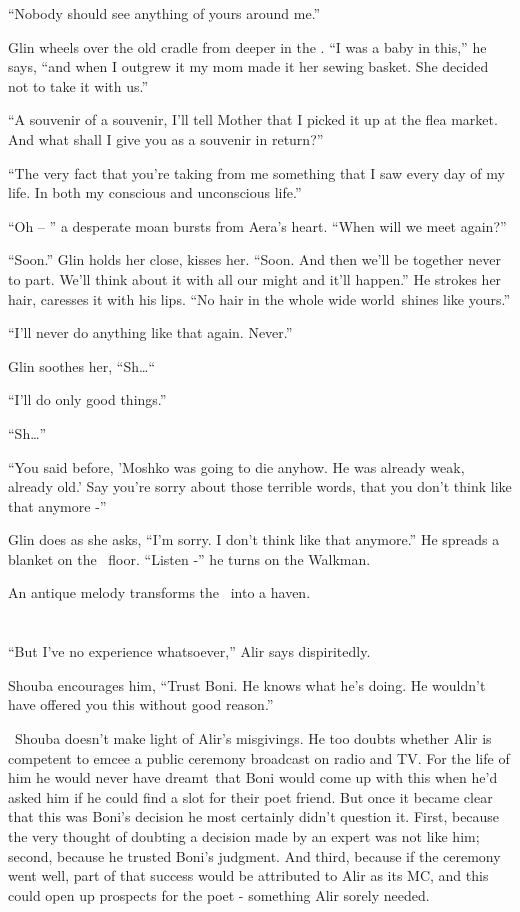 \documentclass[twoside,11pt]{book}
\begin{document}
``Nobody should see anything of yours around me.''

Glin wheels over the old cradle from deeper in the . ``I was a baby in this,'' he says,
``and when I outgrew it my mom made it her sewing basket. She decided not to take it with
us.''

``A souvenir of a souvenir, I'll tell Mother that I picked it up at the flea market. And what shall I give
you as a souvenir in return?''

``The very fact that you're taking from me something that I saw every day of my life. In both my conscious
and unconscious life.''

``Oh -- '' a desperate moan bursts from Aera's heart. ``When will we meet
again?''

``Soon.'' Glin holds her close, kisses her. ``Soon. And then we'll be together
never to part. We'll think about it with all our might and it'll happen.'' He strokes her hair, caresses
it with his lips. ``No hair in the whole wide world~shines like yours.''

``I'll never do anything like that again. Never.''

Glin soothes her, ``Sh{\dots}``~

``I'll do only good things.''

``Sh{\dots}''

``You said before, 'Moshko was going to die anyhow. He was already weak, already old.' Say you're sorry
about those terrible words, that you don't think like that anymore -''

Glin does as she asks, ``I'm sorry. I don't think like that anymore.'' He spreads a blanket on
the \ floor. ``Listen -'' he turns on the Walkman.

An antique melody transforms the \ into a haven.


\bigskip

\chapter{}

``But I've no experience whatsoever,'' Alir says dispiritedly.

Shouba encourages him, ``Trust Boni. He knows what he's doing. He wouldn't have offered you this without
good reason.''

~Shouba doesn't make light of Alir's misgivings. He too doubts whether Alir is competent to emcee a public ceremony
broadcast on radio and TV. For the life of him he would never have dreamt~that Boni would come up with this when he'd
asked him if he could find a slot for their poet friend. But once it became clear that this was Boni's decision he most
certainly didn't question it. First, because the very thought of doubting a decision made by an expert was not like
him; second, because he trusted Boni's judgment. And third, because if the ceremony went well, part of that success
would be attributed to Alir as its MC, and this could open up prospects for the poet - something Alir sorely needed.
\end{document}
